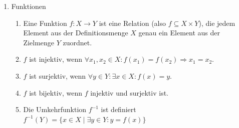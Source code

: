 \begin{enumerate}
\begin{enumerate}
    \item Es ist $R^*$ die reflexiv-transitive H"ulle f"ur eine Relation $R$.
\end{enumerate}
\item Funktionen
\begin{enumerate}
    \item Eine Funktion $f:X\to Y$ ist eine Relation (also $f\subseteq X\times Y$), die jedem Element aus der Definitionsmenge $X$ genau ein Element aus der Zielmenge $Y$ zuordnet.
    \item $f$ ist injektiv, wenn $\forall x_1,x_2\in X: f(x_1)=f(x_2) \Rightarrow x_1=x_2$.
    \item $f$ ist surjektiv, wenn $\forall y\in Y: \exists x\in X: f(x)=y$.
    \item $f$ ist bijektiv, wenn $f$ injektiv und surjektiv ist.
    \item Die Umkehrfunktion $f^{-1}$ ist definiert $f^{-1}(Y)=\{x\in X\mid\exists y\in Y: y=f(x)\}$
\end{enumerate}
\end{enumerate}
